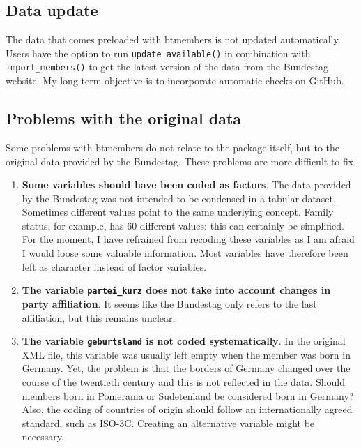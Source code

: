 \documentclass[12pt]{article}
\begin{document}
\hypertarget{data-update}{%
\subsection{Data update}\label{data-update}}

The data that comes preloaded with btmembers is not updated
automatically. Users have the option to run \texttt{update\_available()}
in combination with \texttt{import\_members()} to get the latest version
of the data from the Bundestag website. My long-term objective is to
incorporate automatic checks on GitHub.

\hypertarget{problems-with-the-original-data}{%
\subsection{Problems with the original
data}\label{problems-with-the-original-data}}

Some problems with btmembers do not relate to the package itself, but to
the original data provided by the Bundestag. These problems are more
difficult to fix.

\begin{enumerate}
\def\labelenumi{\arabic{enumi}.}
\item
  \textbf{Some variables should have been coded as factors}. The data
  provided by the Bundestag was not intended to be condensed in a
  tabular dataset. Sometimes different values point to the same
  underlying concept. Family status, for example, has 60 different
  values: this can certainly be simplified. For the moment, I have
  refrained from recoding these variables as I am afraid I would loose
  some valuable information. Most variables have therefore been left as
  character instead of factor variables.
\item
  \textbf{The variable \texttt{partei\_kurz} does not take into account
  changes in party affiliation}. It seems like the Bundestag only refers
  to the last affiliation, but this remains unclear.
\item
  \textbf{The variable \texttt{geburtsland} is not coded
  systematically}. In the original XML file, this variable was usually
  left empty when the member was born in Germany. Yet, the problem is
  that the borders of Germany changed over the course of the twentieth
  century and this is not reflected in the data. Should members born in
  Pomerania or Sudetenland be considered born in Germany? Also, the
  coding of countries of origin should follow an internationally agreed
  standard, such as ISO-3C. Creating an alternative variable might be
  necessary.
\end{enumerate}
\end{document}
